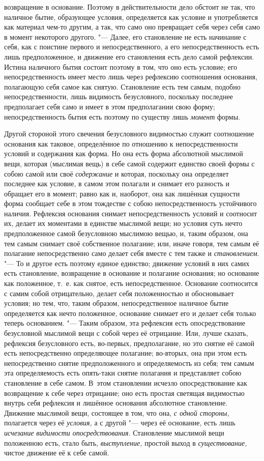 возвращение в основание. Поэтому в действительности дело обстоит не так,
что наличное бытие, образующее условия, определяется как условие и
употребляется как материал чем-то другим, а так, что само оно превращает
себя через себя само в момент некоторого другого. "--- Далее, его становление
не есть начинание с себя, как с поистине первого и непосредственного, а его
непосредственность есть лишь предположенное, и движение его становления
есть дело самой рефлексии. Истина наличного бытия состоит поэтому в том,
что оно есть условие; его непосредственность имеет место лишь через
рефлексию соотношения основания, полагающую себя самое как снятую.
Становление есть тем самым, подобно непосредственности, лишь видимость
безусловного, поскольку последнее предполагает себя само и имеет в этом
предполагании свою форму; непосредственность бытия есть поэтому по существу
лишь {\em момент} формы.

Другой стороной этого свечения безусловного видимостью служит соотношение
основания как таковое, определённое по отношению к непосредственности
условий и содержания как форма. Но она есть форма абсолютной мыслимой вещи,
которая (мыслимая вещь) в себе самой содержит единство своей формы с собою
самой или своё {\em содержание} и которая, поскольку
она определяет последнее как условие, в самом этом полагали и снимает его
разность и обращает его в момент; равно как и, наоборот, она как лишённая
сущности форма сообщает себе в этом тождестве с собою непосредственность
устойчивого наличия. Рефлексия основания снимает непосредственность условий
и соотносит их, делает их моментами в единстве мыслимой вещи; но условия
суть нечто предположенное самой безусловною мыслимою вещью, и, таким
образом, она тем самым снимает своё собственное полагание; или, иначе
говоря, тем самым её полагание непосредственно само делает себя вместе с
тем также и {\em становлением}. "--- То и другое есть
поэтому единое единство; движение условий в них самих есть становление,
возвращение в основание и полагание основания; но основание как положенное,
т.~е. как снятое, есть непосредственное. Основание соотносится с самим
собой отрицательно, делает себя положенностью и обосновывает условия; но
тем, что, таким образом, непосредственное наличное бытие определяется как
нечто положенное, основание снимает его и делает себя только теперь
основанием. "--- Таким образом, эта рефлексия есть опосредствование
безусловной мыслимой вещи с собой через её отрицание. Или, лучше сказать,
рефлексия безусловного есть, во-первых, предполагание, но это снятие её
самой есть непосредственно определяющее полагание; во-вторых, она при этом
есть непосредственно снятие предположенного и определяемость из себя; тем
самым эта определяемость есть опять-таки снятие полагания и представляет
собою становление в себе самом. В~этом становлении исчезло опосредствование
как возвращение к себе через отрицание; оно есть простая светящая
видимостью внутрь себя рефлексия и лишённое основания абсолютное
становление. Движение мыслимой вещи, состоящее в том, что она,
{\em с одной стороны,} полагается через её
{\em условия,} а с другой "--- через её основание, есть
лишь {\em исчезание видимости опосредствования}.
Становление мыслимой вещи положенною есть, стало быть,
{\em выступление,} простой выход в
{\em существование,} чистое движение её к себе самой.

